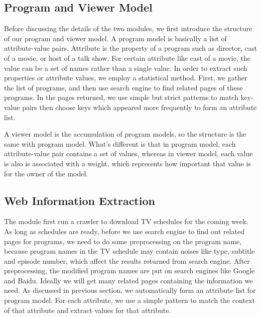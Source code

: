\subsection{Program and Viewer Model}
Before discussing the details of the two modules, we first introduce the
structure of our program and viewer model. A program model is basically a list
of attribute-value pairs. Attribute is the property of 
a program such as director, 
cast of a movie, or host of a talk show.
For certain attribute like cast of a movie, 
the value can be a set of names rather than
a single value.
In order to extract such properties or attribute values, 
we employ a statistical method.
First, we gather the list of programs, and then use 
search engine to find related pages of these programs. 
In the pages returned, we use simple but strict patterns to
match key-value pairs then choose keys which appeared more frequently 
to form an attribute list. 

A viewer model is the accumulation of program models, so the structure
is the same with program model. 
What's different is that in program model, each attribute-value
pair contains a set of values, whereas in viewer model, each value is also
is associated with a weight, which represents how important that 
value is for the owner of the model.

\subsection{Web Information Extraction}
The module first run a crawler to download TV
schedules for the coming week. As long as schedules are ready, 
before we use search engine to find out related pages for programs, 
we need to do some preprocessing on the program
name, because program names in the TV schedule may contain 
noises like type, subtitle and episode number, which affect the results
returned from search engine. After preprocessing, 
the modified program names are put on search engines like Google and Baidu. 
Ideally we will get many related
pages containing the information we need. 
As discussed in previous section, we automatically
form an attribute list for program model. 
For each attribute, we use a simple pattern to match
the context of that attribute and extract values for that attribute.

